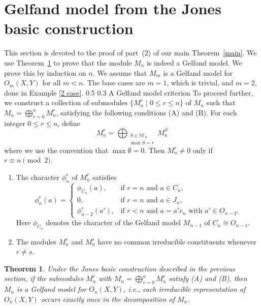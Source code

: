 \documentclass[12pt,reqno]{amsart}
\makeatletter
\renewcommand{\subsection}{\@startsection{subsection}{2}{0pt}%
  {0.5\baselineskip}%
  {0.3\baselineskip}%
  {\normalfont\bfseries}}
\numberwithin{equation}{section}
\newtheorem{theorem}{Theorem}[section]
\theoremstyle{definition}
\theoremstyle{definition}
\newcommand{\YF}{\mathbb{YF}}
\makeatother
\begin{document}
\section{Gelfand model from the Jones basic construction}\label{gelfand section}
This section is devoted to the proof of part~(2) of our main Theorem~\ref{main}. We use Theorem~\ref{gelfand model} to prove that the module $M_n$ is indeed a Gelfand model. We prove this by induction on $n$. We assume that $M_m$ is a Gelfand model for $O_m(X,Y)$ for all $m < n$. The base cases are $m=1$, which is trivial, and $m=2$, done in Example \ref{2 case}. 
\subsection{A Gelfand model criterion}
To proceed further, we construct a collection of submodules
$\{M_n^r\mid 0\leq r\leq n\}$ of $M_n$ such that
$M_n=\bigoplus_{r=0}^n M_n^r$, satisfying the following conditions (A) and (B).
For each integer $0\leq r\leq n$, define
\[
M_n^r=\bigoplus_{\substack{S\in\YF_n\\ \max S=r}}M_n^S
\]
where we use the convention that $\max\emptyset=0$.
Then $M_n^r\neq0$ only if $r\equiv n\pmod 2$.
\begin{enumerate}[label=(\Alph*)]
    \item The character $\phi_n^r$ of $M_n^r$ satisfies
\begin{equation}\label{character relations}
\phi_n^r(a)=
\begin{cases}
\phi_{C_n}(a), & \text{if $r=n$ and $a\in C_n$},\\
0, & \text{if $r=n$ and $a\in J_n$},\\
\phi_{n-2}^r(a'), & \text{if $r<n$ and $a=a'e_n$ with $a'\in O_{n-2}$}.
\end{cases}
\end{equation}
Here $\phi_{C_n}$ denotes the character of the Gelfand model $M_{n-1}$ of $C_n \cong O_{n-1}$.
   \vspace{2mm} 
   \item The modules $M_n^r$ and $M_n^s$ have no common irreducible constituents whenever $r\neq s$. 
\end{enumerate} 
\begin{theorem}\label{gelfand model}
Under the Jones basic construction described in the previous section, if the submodules $M_n^r$ with
$M_n=\bigoplus_{r=0}^n M_n^r$ satisfy (A) and (B), then $M_n$ is a Gelfand model for $O_n(X,Y)$, i.e., each irreducible representation of $O_n(X,Y)$ occurs exactly once in the decomposition of $M_n$.
\end{theorem}
\end{document}
